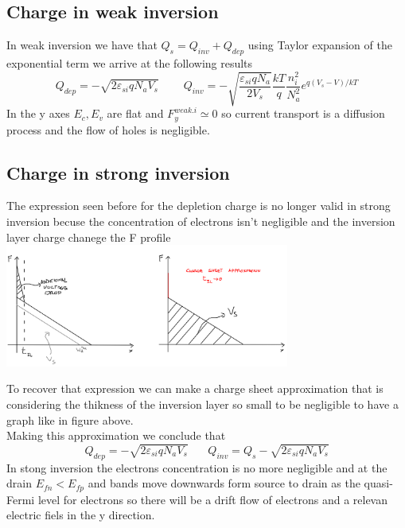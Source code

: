 \subsection{Charge in weak inversion}
In weak inversion we have that $Q_s=Q_{inv}+Q_{dep}$  using Taylor expansion of the exponential term we arrive at the following results
\begin{equation}
Q_{dep}=-\sqrt{2\varepsilon_{si}qN_aV_s}\ \ \ \ \ \ \ \ \ \   Q_{inv}=-\sqrt{\frac{\varepsilon_{si}qN_a}{2V_s}}\frac{kT}{q}\frac{n_i^2}{N_a^2}e^{q(V_s-V)/kT}
\end{equation}
In the y axes $E_c, E_v$ are flat and $F_y^{weak.i}\simeq0$ so current transport is a diffusion process and the flow of holes is negligible.

\subsection{Charge in strong inversion}
The expression seen before for the depletion charge is no longer valid in strong inversion becuse the concentration of electrons isn't negligible and the inversion layer charge chanege the F profile \\


\centering
\includegraphics[width=0.7\textwidth]{csa.png}\\
\raggedright

To recover that expression we can make a charge sheet approximation that is considering the thikness of the inversion layer so small to be negligible to have a graph like in figure above.\\
Making this approximation we conclude that
\begin{equation}
Q_{dep}=-\sqrt{2\varepsilon_{si}qN_aV_s} \ \ \ \ \ \ \ \ Q_{inv}=Q_s-\sqrt{2\varepsilon_{si}qN_aV_s}
\end{equation}
In stong inversion the electrons concentration is no more negligible and at the drain $E_{fn}<E_{fp}$ and bands move downwards form source to drain as the quasi-Fermi level for electrons so there will be a drift flow of electrons and a relevan electric fiels in the y direction.


